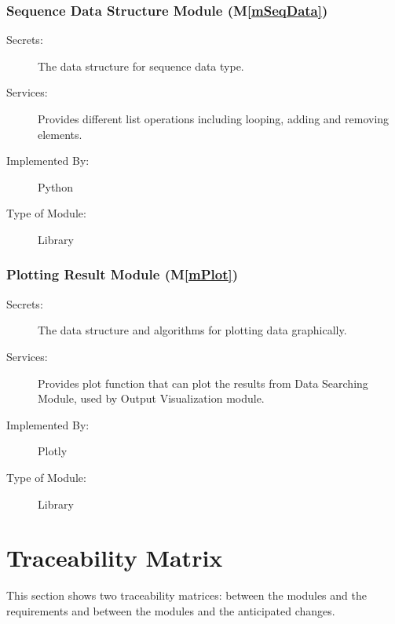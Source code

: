 \documentclass[12pt, titlepage]{article}
\newcommand{\mref}[1]{M\ref{#1}}
\begin{document}
\subsubsection{Sequence Data Structure Module (\mref{mSeqData})}
\begin{description}
\item[Secrets:] The data structure for sequence data type. 
\item[Services:] Provides different list operations including looping, adding and removing elements. 
\item[Implemented By:] Python
\item[Type of Module:] Library
\end{description}

\subsubsection{Plotting Result Module (\mref{mPlot})}
\begin{description}
\item[Secrets:] The data structure and algorithms for plotting data graphically. 
\item[Services:] Provides plot function that can plot the results from Data Searching Module, used by Output Visualization module. 
\item[Implemented By:] Plotly 
\item[Type of Module:] Library
\end{description}

\section{Traceability Matrix} \label{SecTM}

This section shows two traceability matrices: between the modules and the
requirements and between the modules and the anticipated changes.
\end{document}

